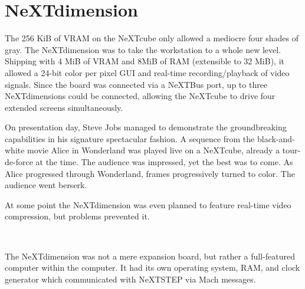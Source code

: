 \section{NeXTdimension}
\vspace{-3pt}
The 256 KiB of VRAM on the NeXTcube only allowed a mediocre four shades of gray. The NeXTdimension was to take the workstation to a whole new level. Shipping with 4 MiB of VRAM and 8MiB of RAM (extensible to 32 MiB), it allowed a 24-bit color per pixel GUI and real-time recording/playback of video signals. Since the board was connected via a NeXTBus port, up to three NeXTdimensions could be connected, allowing the NeXTcube to drive four extended screens simultaneously.\\
\vspace{-2pt}
\par
On presentation day, Steve Jobs managed to demonstrate the groundbreaking capabilities in his signature spectacular fashion. A sequence from the black-and-white movie Alice in Wonderland was played live on a NeXTcube, already a tour-de-force at the time. The audience was impressed, yet the best was to come. As Alice progressed through Wonderland, frames progressively turned to color. The audience went berserk.\\
\par
At some point the NeXTdimension was even planned to feature real-time video compression, but problems prevented it.\\
\par
{}\\
\par
\vspace{-2pt}
The NeXTdimension was not a mere expansion board, but rather a full-featured computer within the computer. It had its own operating system, RAM, and clock generator which communicated with NeXTSTEP via Mach messages.\\
\par
{}\\
